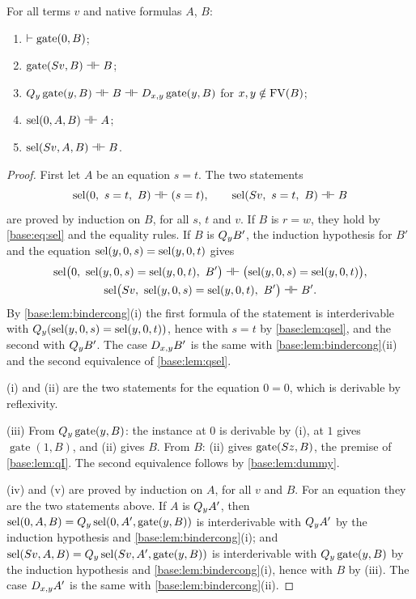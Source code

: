 \begin{lemma}
\label{base:lem:gate}
For all terms $v$ and native formulas $A$, $B$:
\begin{enumerate}[label=\textup{(\roman*)}]
\item $\vdash\operatorname{gate}(0,B)$;
\item $\operatorname{gate}(S v,B)\dashv\vdash B$;
\item $Q_{y}\operatorname{gate}(y,B)\dashv\vdash B\dashv\vdash
 D_{x,y}\operatorname{gate}(y,B)$ for $x,y\notin\operatorname{FV}(B)$;
\item $\operatorname{sel}(0,A,B)\dashv\vdash A$;
\item $\operatorname{sel}(S v,A,B)\dashv\vdash B$.
\end{enumerate}
\end{lemma}

\begin{proof}
First let $A$ be an equation $s=t$.  The two statements
\[
 \sel(0,\ s=t,\ B)\dashv\vdash(s=t),\qquad
 \sel(\Suc v,\ s=t,\ B)\dashv\vdash B
\]
are proved by induction on $B$, for all $s$, $t$ and $v$.  If $B$ is $r=w$,
they hold by \eqref{base:eq:sel} and the equality rules.  If $B$ is
$Q_{y}B'$, the induction hypothesis for $B'$ and the equation
$\operatorname{sel}(y,0,s)=\operatorname{sel}(y,0,t)$ gives
\begin{gather*}
 \operatorname{sel}\bigl(0,\ \operatorname{sel}(y,0,s)=\operatorname{sel}(y,0,t),\ B'\bigr)\dashv\vdash
 \bigl(\operatorname{sel}(y,0,s)=\operatorname{sel}(y,0,t)\bigr),\\
 \operatorname{sel}\bigl(S v,\ \operatorname{sel}(y,0,s)=\operatorname{sel}(y,0,t),\ B'\bigr)\dashv\vdash B' .
\end{gather*}
By \cref{base:lem:bindercong}(i) the first formula of the statement is
interderivable with $Q_{y}(\operatorname{sel}(y,0,s)=\operatorname{sel}(y,0,t))$, hence with $s=t$ by
\cref{base:lem:qsel}, and the second with $Q_{y}B'$.  The case
$D_{x,y}B'$ is the same with \cref{base:lem:bindercong}(ii) and the second
equivalence of \cref{base:lem:qsel}.

(i) and (ii) are the two statements for the equation $0=0$, which is
derivable by reflexivity.

(iii) From $Q_{y}\operatorname{gate}(y,B)$: the instance at $0$ is
derivable by (i),  at $1$ gives $\operatorname{gate}(1,B)$, and
(ii) gives $B$.  From $B$: (ii) gives $\operatorname{gate}(S z,B)$, the
premise of \cref{base:lem:qI}.  The second equivalence follows by
\cref{base:lem:dummy}.

(iv) and (v) are proved by induction on $A$, for all $v$ and $B$.  For an
equation they are the two statements above.  If $A$ is $Q_{y}A'$, then
$\operatorname{sel}(0,A,B)=Q_{y}\operatorname{sel}(0,A',\operatorname{gate}(y,B))$ is interderivable
with $Q_{y}A'$ by the induction hypothesis and
\cref{base:lem:bindercong}(i); and
$\operatorname{sel}(S v,A,B)=Q_{y}\operatorname{sel}(S v,A',\operatorname{gate}(y,B))$ is
interderivable with $Q_{y}\operatorname{gate}(y,B)$ by the induction
hypothesis and \cref{base:lem:bindercong}(i), hence with $B$ by (iii).  The
case $D_{x,y}A'$ is the same with \cref{base:lem:bindercong}(ii).
\end{proof}

